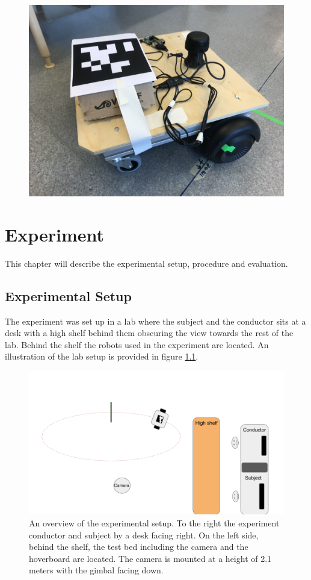 \documentclass[nofilelist]{cslthse-msc}
\begin{document}
\begin{figure}[!hbt]
   \centering
   \includegraphics[scale=0.05]{images/hoverboard.jpg} 
   \caption{}
   \label{fig:hoverboard}
\end{figure}

\chapter{Experiment}
This chapter will describe the experimental setup, procedure and evaluation.

\section{Experimental Setup}
The experiment was set up in a lab where the subject and the conductor sits at a desk with a high shelf behind them obscuring the view towards the rest of the lab. Behind the shelf the robots used in the experiment are located. An illustration of the lab setup is provided in figure \ref{fig:exp-setup}. 

\begin{figure}[!hbt]
   \centering
   \includegraphics[scale=0.3]{images/exp-setup.png} 
   \caption{An overview of the experimental setup. To the right the experiment conductor and subject by a desk facing right. On the left side, behind the shelf, the test bed including the camera and the hoverboard are located. The camera is mounted at a height of 2.1 meters with the gimbal facing down.}
   \label{fig:exp-setup}
\end{figure}
\end{document}
